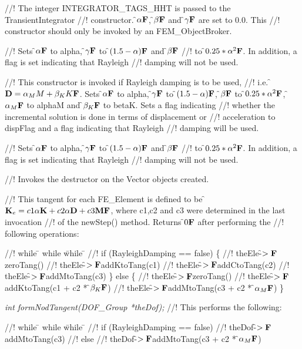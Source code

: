 //! The integer INTEGRATOR\_TAGS\_HHT is passed to the TransientIntegrator
//! constructor. \f$\alpha{\bf F}$, \f$\beta{\bf F}$ and \f$\gamma{\bf F}$ are set to 0.0. This
//! constructor should only be invoked by an FEM\_ObjectBroker.

//! Sets \f$\alpha{\bf F}$ to \p alpha, \f$\gamma{\bf F}$ to \f$(1.5 - \alpha){\bf F}$ and \f$\beta{\bf F}$
//! to \f$0.25*\alpha^2{\bf F}$. In addition, a flag is set indicating that Rayleigh
//! damping will not be used.

//! This constructor is invoked if Rayleigh damping is to be used, 
//! i.e. \f${\bf D} = \alpha_M M + \beta_K K{\bf F}$. Sets \f$\alpha{\bf F}$ to \p alpha,
\f$\gamma{\bf F}$ to \f$(1.5 - \alpha){\bf F}$, \f$\beta{\bf F}$ to \f$0.25*\alpha^2{\bf F}$, \f$\alpha_M{\bf F}$ to
\p alphaM and \f$\beta_K{\bf F}$ to \p betaK. Sets a flag indicating
//! whether the incremental solution is done in terms of displacement or
//! acceleration to \p dispFlag and a flag indicating that Rayleigh
//! damping will be used. 

//! Sets \f$\alpha{\bf F}$ to \p alpha, \f$\gamma{\bf F}$ to \f$(1.5 - \alpha){\bf F}$ and \f$\beta{\bf F}$
//! to \f$0.25*\alpha^2{\bf F}$. In addition, a flag is set indicating that Rayleigh
//! damping will not be used.

//! Invokes the destructor on the Vector objects created.

//! This tangent for each FE\_Element is defined to be \f${\bf K}_e = c1\alpha {\bf K}
+ c2\alpha {\bf D} + c3 {\bf M}{\bf F}$, where c1,c2 and c3 were determined in the last invocation
//! of the newStep() method. Returns \f$0{\bf F}$ after performing the
//! following operations:  
\begin{tabbing}
//! while \= \+ while \= while \= \kill
//! if (RayleighDamping == false) \{ \+
//! theEle-\f$>{\bf F}$zeroTang()
//! theEle-\f$>{\bf F}$addKtoTang(c1)
//! theEle-\f$>{\bf F}$addCtoTang(c2)
//! theEle-\f$>{\bf F}$addMtoTang(c3)  \-
\} else \{ \+
//! theEle-\f$>{\bf F}$zeroTang()
//! theEle-\f$>{\bf F}$addKtoTang(c1 + c2 * \f$\beta_K{\bf F}$)
//! theEle-\f$>{\bf F}$addMtoTang(c3 + c2 * \f$\alpha_M{\bf F}$)  \- 
\}
\end{tabbing}

{\em int formNodTangent(DOF\_Group *theDof);}
//! This performs the following:
\begin{tabbing}
//! while \= \+ while \= while \= \kill
//! if (RayleighDamping == false)  \+
//! theDof-\f$>{\bf F}$addMtoTang(c3)  \-
//! else \+
//! theDof-\f$>{\bf F}$addMtoTang(c3 + c2 * \f$\alpha_M{\bf F}$)  \- 
\end{tabbing}


